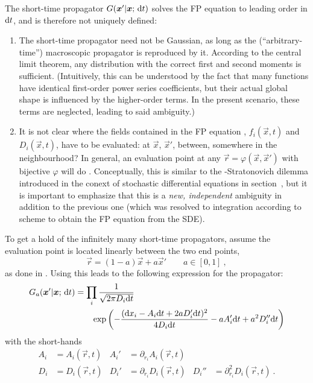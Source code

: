The short-time propagator \(G(\boldsymbol{x}'|\boldsymbol{x};\,\mathrm{d} t)\) solves the FP equation to leading order in \(\mathrm{d} t\), and is therefore not uniquely defined:
%
\begin{enumerate}
	\item The short-time propagator need not be Gaussian, as long as the (``arbitrary-time'') macroscopic propagator is reproduced by it. According to the central limit theorem, any distribution with the correct first and second moments is sufficient. (Intuitively, this can be understood by the fact that many functions have identical first-order power series coefficients, but their actual global shape is influenced by the higher-order terms. In the present scenario, these terms are neglected, leading to said ambiguity.)
	\item It is not clear where the fields contained in the FP equation , \(f_i(\vec x,t)\) and \(D_i(\vec x,t)\), have to be evaluated: at \(\vec x\), \(\vec x'\), between, somewhere in the neighbourhood? In general, an evaluation point at any \(\vec r = \varphi(\vec x,\vec x')\) with bijective \(\varphi\) will do \cite{wissel}. Conceptually, this is similar to the \Ito{}-Stratonovich dilemma introduced in the conext of stochastic differential equations in section~, but it is important to emphasize that this is a \emph{new, independent} ambiguity in addition to the previous one (which was resolved to integration according to \Ito{} scheme to obtain the FP equation from the SDE).
\end{enumerate}
%
To get a hold of the infinitely many short-time propagators, assume the evaluation point is located linearly between the two end points,
%
\begin{equation}
	\vec r = (1-a)\vec x + a\vec x' \qquad a\in[0,1] ~,
\end{equation}
%
as done in \cite{sf}. Using \cite{wissel, donoso} this leads to the following expression for the propagator:
%
\begin{equation}\begin{split}
	\label{eqn:propagator general}
	G_a(\boldsymbol{x}'|\boldsymbol{x};\,\mathrm{d} t)
	&= \prod_i \frac1{\sqrt{2\pi D_i\mathrm{d} t}}
	\\&\qquad
	\operatorname{exp}\left(
		- \frac{(\mathrm{d} x_i-A_i\mathrm{d} t+2aD_i'\mathrm{d} t)^2}{4D_i\mathrm{d} t}
		- a A_i'\mathrm{d} t
		+ a^2 D_i''\mathrm{d} t
		\right)
\end{split}\end{equation}
%
with the short-hands
%
\begin{align*}
	A_i &= A_i(\vec r,t)  &  A_i' &= \partial_{r_i}A_i(\vec r,t) \\
	D_i &= D_i(\vec r,t)  &  D_i' &= \partial_{r_i}D_i(\vec r,t)  &  D_i'' &= \partial_{r_i}^2D_i(\vec r,t) ~.
\end{align*}


